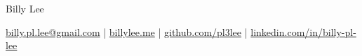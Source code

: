 \centerline{\Huge Billy Lee}

\vspace{5pt}

\centerline{\href{mailto:billy.pl.lee@gmail.com}{billy.pl.lee@gmail.com} | \href{https://billylee.me}{billylee.me} | \href{https://github.com/pl3lee}{github.com/pl3lee} | \href{https://linkedin.com/in/billy-pl-lee}{linkedin.com/in/billy-pl-lee}} 